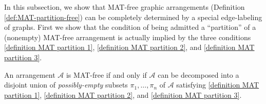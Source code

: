 In this subsection, we show that MAT-free graphic arrangements (Definition \ref{def:MAT-partition-free}) can be completely determined by a  special edge-labeling of graphs. 
First we show that the condition of being admitted a ``partition'' of a (nonempty) MAT-free arrangement is actually implied by the three conditions \ref{definition MAT partition 1}, \ref{definition MAT partition 2}, and \ref{definition MAT partition 3}. 
\begin{proposition}\label{no internal empty block}
An arrangement $ \mathcal{A} $ is MAT-free if and only if $ \mathcal{A} $ can be decomposed into a disjoint union of \emph{possibly-empty} subsets $ \pi_{1}, \dots, \pi_{n} $ of $ \mathcal{A} $ satisfying \ref{definition MAT partition 1}, \ref{definition MAT partition 2}, and \ref{definition MAT partition 3}. 
\end{proposition}
